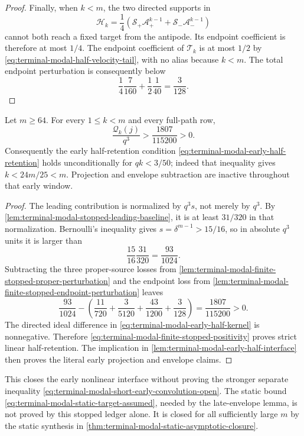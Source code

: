 \begin{proof}
Finally, when $k<m$, the two directed supports in
\begin{equation}
 \mathcal H_k=\frac14\left(
 \mathcal S_+\mathcal A_+^{k-1}
 +\mathcal S_-\mathcal A_-^{k-1}\right)
\end{equation}
cannot both reach a fixed target from the antipode.  Its endpoint coefficient
is therefore at most $1/4$.  The endpoint coefficient of $\mathcal T_k$ is
at most $1/2$ by
\eqref{eq:terminal-modal-half-velocity-tail}, with no alias because $k<m$.
The total endpoint perturbation is consequently below
\begin{equation}
 \frac14\frac7{160}+\frac12\frac1{40}=\frac3{128}.
\end{equation}
\end{proof}

\begin{theorem}
\label{thm:terminal-modal-finite-stopped-positivity}
Let $m\ge64$.  For every $1\le k<m$ and every full-path row,
\begin{equation}
 \frac{\mathcal Q_k(j)}{q^3}>\frac{1807}{115200}>0.
 \label{eq:terminal-modal-finite-stopped-positivity}
\end{equation}
Consequently the early half-retention condition
\eqref{eq:terminal-modal-early-half-retention} holds unconditionally for
$qk<3/50$; indeed that inequality gives $k<24m/25<m$.  Projection and
envelope subtraction are inactive throughout
that early window.
\end{theorem}

\begin{proof}
The leading contribution is normalized by $q^3s$, not merely by $q^3$.
By \cref{lem:terminal-modal-stopped-leading-baseline}, it is at least
$31/320$ in that normalization.  Bernoulli's inequality gives
$s=\delta^{m-1}>15/16$, so in absolute $q^3$ units it is larger than
\begin{equation}
 \frac{15}{16}\frac{31}{320}=\frac{93}{1024}.
\end{equation}
Subtracting the three proper-source losses from
\cref{lem:terminal-modal-finite-stopped-proper-perturbation} and the endpoint
loss from
\cref{lem:terminal-modal-finite-stopped-endpoint-perturbation} leaves
\begin{equation}
 \frac{93}{1024}
 -\left(\frac{11}{720}+\frac3{5120}
       +\frac{43}{1200}+\frac3{128}\right)
 =\frac{1807}{115200}>0.
\end{equation}
The directed ideal difference in
\eqref{eq:terminal-modal-early-half-kernel} is nonnegative.  Therefore
\eqref{eq:terminal-modal-finite-stopped-positivity} proves strict linear
half-retention.  The implication in
\cref{lem:terminal-modal-early-half-interface} then proves the literal early
projection and envelope claims.
\end{proof}

This closes the early nonlinear interface without proving the stronger
separate inequality
\eqref{eq:terminal-modal-short-early-convolution-open}.  The static bound
\eqref{eq:terminal-modal-static-target-assumed}, needed by the late-envelope
lemma, is not proved by this stopped ledger alone.  It is closed for all
sufficiently large $m$ by the static synthesis in
\cref{thm:terminal-modal-static-asymptotic-closure}.
